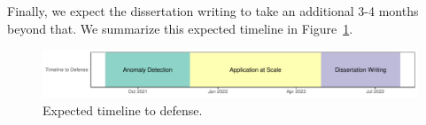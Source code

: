 Finally, we expect the dissertation writing to take an additional 3-4 months beyond that.  We summarize this expected timeline in Figure~\ref{fig:timeline}.
  
\begin{figure}[hb]
  \caption{Expected timeline to defense.\label{fig:timeline}}
  \centering
  \includegraphics[width = \linewidth]{images/timeline}
\end{figure}

